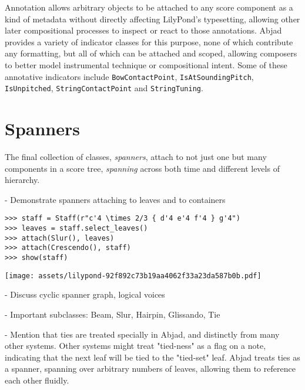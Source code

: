 \noindent Annotation allows arbitrary objects to be attached to any score
component as a kind of metadata without directly affecting LilyPond's
typesetting, allowing other later compositional processes to inspect or react
to those annotations. Abjad provides a variety of indicator classes for this
purpose, none of which contribute any formatting, but all of which can be
attached and scoped, allowing composers to better model instrumental technique
or compositional intent. Some of these annotative indicators include
\texttt{BowContactPoint}, \texttt{IsAtSoundingPitch}, \texttt{IsUnpitched},
\texttt{StringContactPoint} and \texttt{StringTuning}.

\section{Spanners}

The final collection of classes, \emph{spanners}, attach to not just one but
many components in a score tree, \emph{spanning} across both time and different
levels of hierarchy.

-   Demonstrate spanners attaching to leaves and to containers

\begin{comment}
<abjad>
staff = Staff(r"c'4 \times 2/3 { d'4 e'4 f'4 } g'4")
leaves = staff.select_leaves()
attach(Slur(), leaves)
attach(Crescendo(), staff)
show(staff)
</abjad>
\end{comment}

\begin{abjadbookoutput}
\begin{singlespacing}
\vspace{-0.5\baselineskip}
\begin{lstlisting}
>>> staff = Staff(r"c'4 \times 2/3 { d'4 e'4 f'4 } g'4")
>>> leaves = staff.select_leaves()
>>> attach(Slur(), leaves)
>>> attach(Crescendo(), staff)
>>> show(staff)
\end{lstlisting}
\noindent\texttt{[image: assets/lilypond-92f892c73b19aa4062f33a23da587b0b.pdf]}
\end{singlespacing}
\end{abjadbookoutput}

-   Discuss cyclic spanner graph, logical voices

-   Important subclasses: Beam, Slur, Hairpin, Glissando, Tie

-   Mention that ties are treated specially in Abjad, and distinctly from many
    other systems. Other systems might treat "tied-ness" as a flag on a note,
    indicating that the next leaf will be tied to the "tied-set" leaf. Abjad
    treats ties as a spanner, spanning over arbitrary numbers of leaves,
    allowing them to reference each other fluidly.


